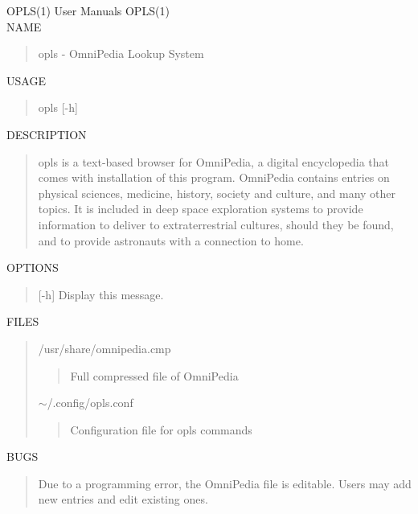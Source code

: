 \documentclass{article}
\begin{document}
\newpage
OPLS(1) \hfill User Manuals \hfill OPLS(1) \\

NAME
\begin{quote}
  opls - OmniPedia Lookup System
\end{quote}

USAGE
\begin{quote}
  opls [-h]
\end{quote}

DESCRIPTION
\begin{quote}
  opls is a text-based browser for OmniPedia, a digital encyclopedia that comes with installation of this program. OmniPedia contains entries on physical sciences, medicine, history, society and culture, and many other topics. It is included in deep space exploration systems to provide information to deliver to extraterrestrial cultures, should they be found, and to provide astronauts with a connection to home.
\end{quote}

OPTIONS
\begin{quote}
  [-h] \qquad Display this message.
\end{quote}

FILES
\begin{quote}
  /usr/share/omnipedia.cmp
  \begin{quote}
    Full compressed file of OmniPedia
  \end{quote}
  $\sim$/.config/opls.conf
  \begin{quote}
    Configuration file for opls commands
  \end{quote}
\end{quote}

BUGS
\begin{quote}
  Due to a programming error, the OmniPedia file is editable. Users may add new entries and edit existing ones. 
\end{quote}
\end{document}
